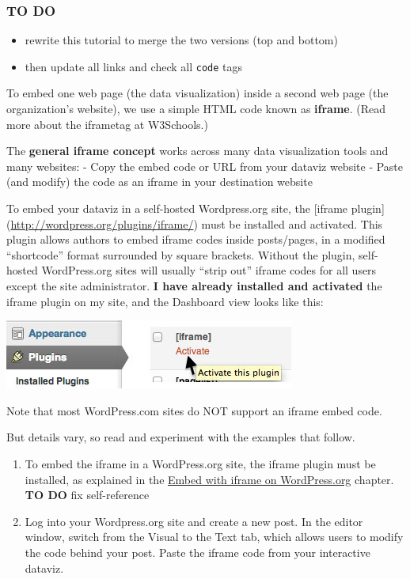 \documentclass[
  english,
]{book}
\providecommand{\tightlist}{%
  \setlength{\itemsep}{0pt}\setlength{\parskip}{0pt}}
\begin{document}
\hypertarget{to-do-1}{%
\subsubsection*{TO DO}\label{to-do-1}}

\begin{itemize}
\tightlist
\item
  rewrite this tutorial to merge the two versions (top and bottom)
\item
  then update all links and check all \texttt{code} tags
\end{itemize}

To embed one web page (the data visualization) inside a second web page (the organization's website), we use a simple HTML code known as \textbf{iframe}. (Read more about the iframetag at W3Schools.)

The \textbf{general iframe concept} works across many data visualization tools and many websites:
- Copy the embed code or URL from your dataviz website
- Paste (and modify) the code as an iframe in your destination website

To embed your dataviz in a self-hosted Wordpress.org site, the {[}iframe plugin{]} (\url{http://wordpress.org/plugins/iframe/}) must be installed and activated. This plugin allows authors to embed iframe codes inside posts/pages, in a modified ``shortcode'' format surrounded by square brackets. Without the plugin, self-hosted WordPress.org sites will usually ``strip out'' iframe codes for all users except the site administrator. \textbf{I have already installed and activated} the iframe plugin on my site, and the Dashboard view looks like this:

\includegraphics{images/07-embed/WordPressOrg-iframe-plugin-activate.jpg}

Note that most WordPress.com sites do NOT support an iframe embed code.

But details vary, so read and experiment with the examples that follow.

\begin{enumerate}
\def\labelenumi{\arabic{enumi})}
\setcounter{enumi}{4}
\item
  To embed the iframe in a WordPress.org site, the iframe plugin must be installed, as explained in the \href{iframe-wordpress}{Embed with iframe on WordPress.org} chapter. \textbf{TO DO} fix self-reference
\item
  Log into your Wordpress.org site and create a new post. In the editor window, switch from the Visual to the Text tab, which allows users to modify the code behind your post. Paste the iframe code from your interactive dataviz.
\end{enumerate}
\end{document}
